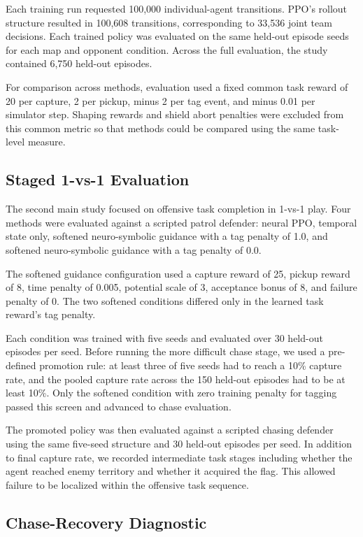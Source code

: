 \documentclass[letterpaper]{article}
\begin{document}
Each training run requested 100,000 individual-agent transitions. PPO's rollout structure resulted in 100,608 transitions, corresponding to 33,536 joint team decisions. Each trained policy was evaluated on the same held-out episode seeds for each map and opponent condition. Across the full evaluation, the study contained 6,750 held-out episodes.

For comparison across methods, evaluation used a fixed common task reward of 20 per capture, 2 per pickup, minus 2 per tag event, and minus 0.01 per simulator step. Shaping rewards and shield abort penalties were excluded from this common metric so that methods could be compared using the same task-level measure.

\subsection{Staged 1-vs-1 Evaluation}

The second main study focused on offensive task completion in 1-vs-1 play. Four methods were evaluated against a scripted patrol defender: neural PPO, temporal state only, softened neuro-symbolic guidance with a tag penalty of 1.0, and softened neuro-symbolic guidance with a tag penalty of 0.0.

The softened guidance configuration used a capture reward of 25, pickup reward of 8, time penalty of 0.005, potential scale of 3, acceptance bonus of 8, and failure penalty of 0. The two softened conditions differed only in the learned task reward's tag penalty.

Each condition was trained with five seeds and evaluated over 30 held-out episodes per seed. Before running the more difficult chase stage, we used a pre-defined promotion rule: at least three of five seeds had to reach a 10\% capture rate, and the pooled capture rate across the 150 held-out episodes had to be at least 10\%. Only the softened condition with zero training penalty for tagging passed this screen and advanced to chase evaluation.

The promoted policy was then evaluated against a scripted chasing defender using the same five-seed structure and 30 held-out episodes per seed. In addition to final capture rate, we recorded intermediate task stages including whether the agent reached enemy territory and whether it acquired the flag. This allowed failure to be localized within the offensive task sequence.

\subsection{Chase-Recovery Diagnostic}
\end{document}
